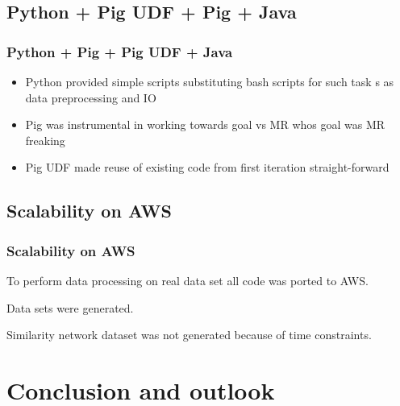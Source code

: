 \documentclass[handout]{beamer}
\begin{document}
\subsection{Python + Pig UDF + Pig + Java}


\begin{frame}
\frametitle{\bf Python + Pig + Pig UDF + Java}

\begin{itemize}
\item Python provided simple scripts substituting bash scripts for such task s as data preprocessing and IO
\item Pig was instrumental in working towards goal vs MR whos goal was MR freaking
\item Pig UDF made reuse of existing code from first iteration straight-forward
\end{itemize}

\end{frame}


\subsection{Scalability on AWS}

\begin{frame}
\frametitle{\bf Scalability on AWS}

To perform data processing on real data set all code was ported to AWS.

Data sets were generated.

Similarity network dataset was not generated because of time constraints.

\end{frame}


\section{Conclusion and outlook}
\end{document}
